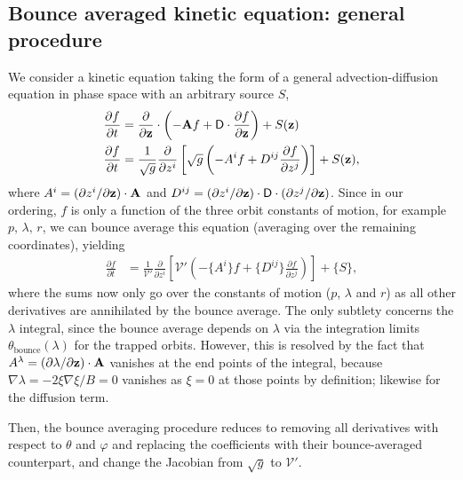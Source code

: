 \documentclass[11pt,a4paper]{article}
\newcommand{\sub}[1]{\ensuremath{_{\text{#1}}}}
\renewcommand{\b}[1]{\ensuremath{ {\bf #1 } }}
\begin{document}
\subsection{Bounce averaged kinetic equation: general procedure}
We consider a kinetic equation taking the form of a general advection-diffusion equation in phase space with an arbitrary source $S$,
\begin{align}
\frac{\partial f}{\partial t} &= \frac{\partial}{\partial \b{z}} \cdot \left( -\b{A} f + \mathsf{D}\cdot \frac{\partial f}{\partial \b{z}}\right) + S(\b{z}) \nonumber \\
\frac{\partial f}{\partial t} &= \frac{1}{\sqrt{g}}\frac{\partial}{\partial z^i}\left[ \sqrt{g} \left(- A^i f +  D^{ij}\frac{\partial f}{\partial z^j}\right)\right] + S(\b{z}),
\end{align}
where $A^i = (\partial z^i/\partial \b{z}) \cdot \b{A}$ and $D^{ij} = (\partial z^i/\partial \b{z}) \cdot \mathsf{D} \cdot (\partial z^j/\partial \b{z})$.
Since in our ordering, $f$ is only a function of the three orbit constants of motion, for example $p,\,\lambda,\,r$, we can bounce average this equation (averaging over the remaining coordinates), yielding
\begin{align}
\frac{\partial f}{\partial t} &= \frac{1}{\mathcal{V}'}\frac{\partial}{\partial z^i} \left[ \mathcal{V}'\left( -\{A^i\} f + \{D^{ij}\} \frac{\partial f}{\partial z^j} \right)\right] + \{S\},
\label{eq:general bounce average}
\end{align} 
where the sums now only go over the constants of motion ($p$, $\lambda$ and $r$) as all other derivatives are annihilated by the bounce average. The only subtlety concerns the $\lambda$ integral, since the bounce average depends on $\lambda$ via the integration limits $\theta\sub{bounce}(\lambda)$ for the trapped orbits. However, this is resolved by the fact that $A^\lambda = (\partial\lambda/\partial \b{z}) \cdot \b{A}$ vanishes at the end points of the integral, because  $\nabla \lambda = -2\xi\nabla \xi/B = 0$ vanishes as $\xi=0$ at those points by definition; likewise for the diffusion term.

Then, the bounce averaging procedure reduces to removing all derivatives with respect to $\theta$ and $\varphi$ and replacing the coefficients with their bounce-averaged counterpart, and change the Jacobian from $\sqrt{g}$ to $\mathcal{V}'$.
\end{document}
